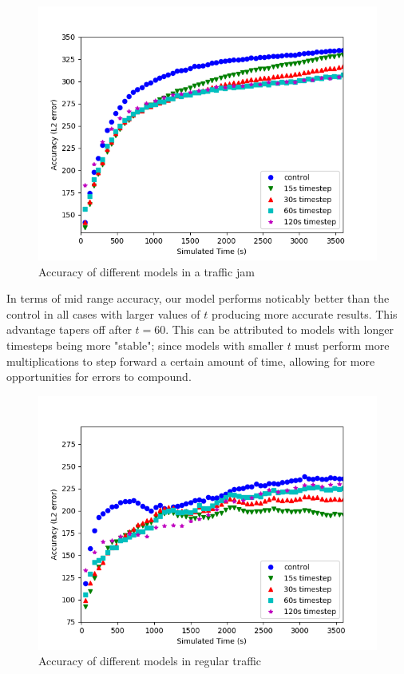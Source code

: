 \documentclass[a4paper]{article}
\begin{document}
\begin{figure}[H]
    \centering
    \includegraphics[width=1\textwidth]{Results.png}
	\caption{Accuracy of different models in a traffic jam}
    \label{fig:acc}
\end{figure}

In terms of mid range accuracy, our model performs noticably better than the control in all cases with larger values of $t$ producing more accurate results.
This advantage tapers off after $t = 60$. This can be attributed to models with longer timesteps being more "stable"; since models with smaller $t$ must perform 
more multiplications to step forward a certain amount of time, allowing for more opportunities for errors to compound.

\begin{figure}[H]
    \centering
    \includegraphics[width=1\textwidth]{Results2.png}
	\caption{Accuracy of different models in regular traffic}
    \label{fig:reg}
\end{figure}
\end{document}
